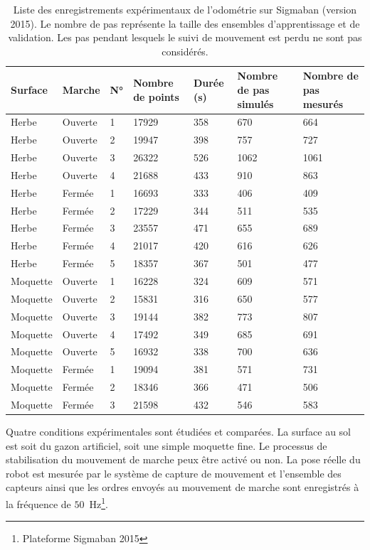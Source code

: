 \begin{table}[h]
    \centerfloat
    \small
    \begin{tabular}{|l|l|l|p{2cm}|l|p{2.2cm}|p{2.2cm}|}
        \hline
        Surface & Marche & N° & Nombre de points & Durée (s) & Nombre de pas simulés & Nombre de pas mesurés \\
        \hline
        Herbe & Ouverte & 1 & 17929 & 358 & 670 & 664 \\
        Herbe & Ouverte & 2 & 19947 & 398 & 757 & 727 \\
        Herbe & Ouverte & 3 & 26322 & 526 & 1062 & 1061 \\
        Herbe & Ouverte & 4 & 21688 & 433 & 910 & 863 \\
        \hline
        Herbe & Fermée & 1 & 16693 & 333 & 406 & 409 \\
        Herbe & Fermée & 2 & 17229 & 344 & 511 & 535 \\
        Herbe & Fermée & 3 & 23557 & 471 & 655 & 689 \\
        Herbe & Fermée & 4 & 21017 & 420 & 616 & 626 \\
        Herbe & Fermée & 5 & 18357 & 367 & 501 & 477 \\
        \hline
        Moquette & Ouverte & 1 & 16228 & 324 & 609 & 571 \\
        Moquette & Ouverte & 2 & 15831 & 316 & 650 & 577 \\
        Moquette & Ouverte & 3 & 19144 & 382 & 773 & 807 \\
        Moquette & Ouverte & 4 & 17492 & 349 & 685 & 691 \\
        Moquette & Ouverte & 5 & 16932 & 338 & 700 & 636 \\
        \hline
        Moquette & Fermée & 1 & 19094 & 381 & 571 & 731 \\
        Moquette & Fermée & 2 & 18346 & 366 & 471 & 506 \\
        Moquette & Fermée & 3 & 21598 & 432 & 546 & 583 \\
        \hline
    \end{tabular}
    \caption{\label{tab:odometry_logs}Liste des enregistrements expérimentaux 
        de l'odométrie sur Sigmaban (version 2015). 
        Le nombre de pas représente la taille des ensembles 
        d'apprentissage et de validation. 
    Les pas pendant lesquels le suivi de mouvement est perdu ne sont pas considérés.}
\end{table}

Quatre conditions expérimentales sont étudiées et comparées.
La surface au sol est soit du gazon artificiel, soit une simple moquette fine.
Le processus de stabilisation du mouvement de marche peux être activé ou non. 
La pose réelle du robot est mesurée par le système de capture de mouvement
et l'ensemble des capteurs ainsi que les ordres envoyés au mouvement de marche 
sont enregistrés à la fréquence de $50$~Hz\footnote{Plateforme Sigmaban 2015}.

